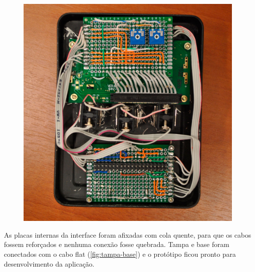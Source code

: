 \begin{figure}[htb]
\begin{minipage}{0.45\textwidth}
		\includegraphics[width=1\textwidth]{img/interface-traz2.jpg}
	\end{minipage}
\end{figure}

As placas internas da interface foram afixadas com cola quente, para que os cabos fossem reforçados e nenhuma conexão fosse quebrada. Tampa e base foram conectados com o cabo flat (\autoref{fig:tampa-base}) e o protótipo ficou pronto para desenvolvimento da aplicação.

